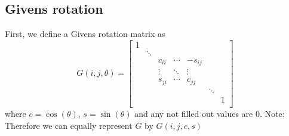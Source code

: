 \documentclass[a4paper]{scrartcl}
\begin{document}
    \subsection{Givens rotation}
        First, we define a Givens rotation matrix as 
        \begin{equation}\label{eq:Givens}
            G(i,j,\theta) = \begin{bmatrix} 
                1   &   &   \\
                    &   \ddots&   \\
                    &   & c_{ii} & \cdots& -s_{ij}\\
                    &   & \vdots & \ddots & \vdots\\
                    &   & s_{ji} & \cdots & c_{jj}\\
                    &   &  & & &\ddots\\
                    &   &  & & &&1\\            
                \end{bmatrix}
        \end{equation}
        where $c=\cos(\theta)$, $s=\sin(\theta)$ and any not filled out values are 0.
        Note: Therefore we can equally represent $G$ by $G(i,j,c,s)$
    
\end{document}
